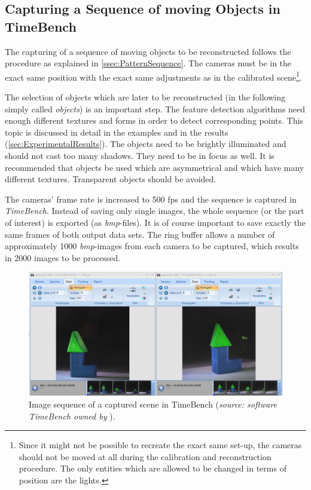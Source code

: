 \subsection{Capturing a Sequence of moving Objects in TimeBench}\label{ssec:CaptureReconstrSequence}
The capturing of a sequence of moving objects to be reconstructed follows the procedure as explained in \autoref{ssec:PatternSequence}. The cameras must be in the exact same position with the exact same adjustments as in the calibrated scene\footnote{Since it might not be possible to recreate the exact same set-up, the cameras should not be moved at all during the calibration and reconstruction procedure. The only entities which are allowed to be changed in terms of position are the lights.}.

The selection of objects which are later to be reconstructed (in the following simply called \textit{objects}) is an important step. The feature detection algorithms need enough different textures and forms in order to detect corresponding points. This topic is discussed in detail in the examples and in the results (\autoref{sec:ExperimentalResults}). The objects need to be brightly illuminated and should not cast too many shadows. They need to be in focus as well. It is recommended that objects be used which are asymmetrical and which have many different textures. Transparent objects should be avoided.

The cameras' frame rate is increased to 500 fps and the sequence is captured in \textit{TimeBench}. Instead of saving only single images, the whole sequence (or the part of interest) is exported (as \textit{bmp}-files). It is of course important to save exactly the same frames of both output data sets. The ring buffer allows a number of approximately 1000 \textit{bmp}-images from each camera to be captured, which results in 2000 images to be processed.

\begin{figure}[htbp]
		\centering
		\includegraphics[width=1.0\textwidth]{figures/timebenchSequence}
		\caption[Image sequence of a captured scene in TimeBench]{Image sequence of a captured scene in TimeBench (\textit{source: software TimeBench owned by} \cite{Optronis.2016}).}
		\label{fig:timebenchSequence}
\end{figure}

